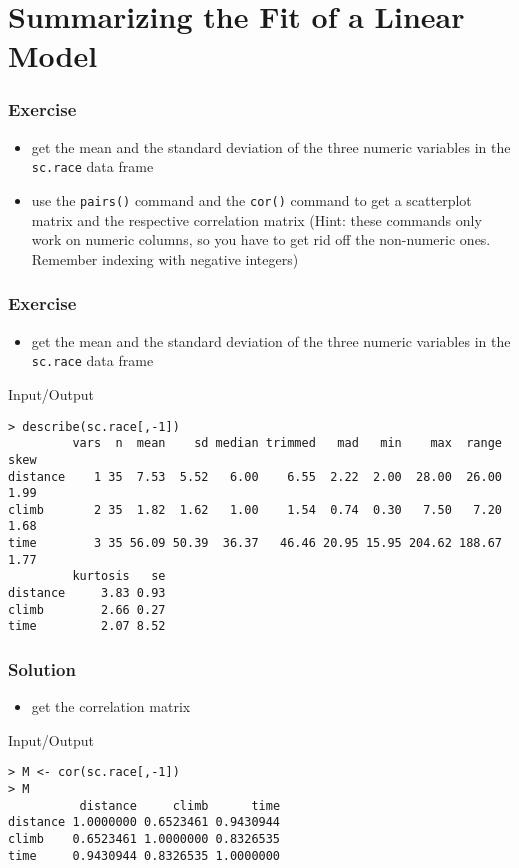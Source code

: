 \section{Summarizing the Fit of a Linear Model}
\begin{frame}\frametitle{Exercise}
  \begin{itemize}
  \item get the mean and the standard deviation of the three numeric variables in the \texttt{sc.race} data frame
  \item use the \texttt{pairs()} command and the \texttt{cor()} command to get a scatterplot matrix and the respective correlation matrix (Hint: these commands only work on numeric columns, so you have to get rid off the non-numeric ones. Remember indexing with negative integers)
  \end{itemize}
\end{frame}


\begin{frame}[fragile]\frametitle{Exercise}
  \begin{itemize}
  \item get the mean and the standard deviation of the three numeric variables in the \texttt{sc.race} data frame
  \end{itemize}
  \begin{exampleblock}{Input/Output}\tiny
\begin{verbatim}
> describe(sc.race[,-1])
         vars  n  mean    sd median trimmed   mad   min    max  range skew
distance    1 35  7.53  5.52   6.00    6.55  2.22  2.00  28.00  26.00 1.99
climb       2 35  1.82  1.62   1.00    1.54  0.74  0.30   7.50   7.20 1.68
time        3 35 56.09 50.39  36.37   46.46 20.95 15.95 204.62 188.67 1.77
         kurtosis   se
distance     3.83 0.93
climb        2.66 0.27
time         2.07 8.52
\end{verbatim}
  \end{exampleblock}
\end{frame}


\begin{frame}[fragile]\frametitle{Solution}
  \begin{itemize}
  \item get the correlation matrix
  \end{itemize}
  \begin{exampleblock}{Input/Output}\small
\begin{verbatim}
> M <- cor(sc.race[,-1])
> M
          distance     climb      time
distance 1.0000000 0.6523461 0.9430944
climb    0.6523461 1.0000000 0.8326535
time     0.9430944 0.8326535 1.0000000
\end{verbatim}
  \end{exampleblock}
\end{frame}



